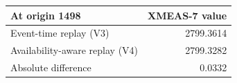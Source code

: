 \begin{tabular}{@{}lr@{}}
\toprule
At origin 1498 & XMEAS-7 value \\
\midrule
Event-time replay (V3) & 2799.3614 \\
Availability-aware replay (V4) & 2799.3282 \\
Absolute difference & 0.0332 \\
\bottomrule
\end{tabular}
